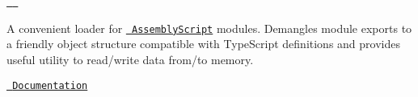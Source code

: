 \href{https://www.npmjs.com/package/@assemblyscript/loader}{\texttt{ }} \href{https://www.npmjs.com/package/@assemblyscript/loader}{\texttt{ }}

A convenient loader for \href{https://assemblyscript.org}{\texttt{ Assembly\+Script}} modules. Demangles module exports to a friendly object structure compatible with Type\+Script definitions and provides useful utility to read/write data from/to memory.

\href{https://assemblyscript.org/loader.html}{\texttt{ Documentation}} 